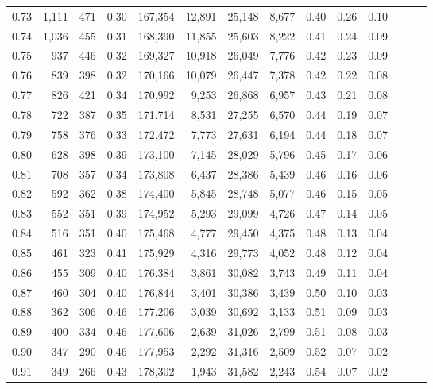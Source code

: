 \begin{tabular}{rrrrrrrrrrrrrr}
0.73 &  1,111 &  471 &  0.30 &  167,354 &   12,891 &  25,148 &   8,677 &  0.40 &  0.26 &      0.10 \\
0.74 &  1,036 &  455 &  0.31 &  168,390 &   11,855 &  25,603 &   8,222 &  0.41 &  0.24 &      0.09 \\
0.75 &    937 &  446 &  0.32 &  169,327 &   10,918 &  26,049 &   7,776 &  0.42 &  0.23 &      0.09 \\
0.76 &    839 &  398 &  0.32 &  170,166 &   10,079 &  26,447 &   7,378 &  0.42 &  0.22 &      0.08 \\
0.77 &    826 &  421 &  0.34 &  170,992 &    9,253 &  26,868 &   6,957 &  0.43 &  0.21 &      0.08 \\
0.78 &    722 &  387 &  0.35 &  171,714 &    8,531 &  27,255 &   6,570 &  0.44 &  0.19 &      0.07 \\
0.79 &    758 &  376 &  0.33 &  172,472 &    7,773 &  27,631 &   6,194 &  0.44 &  0.18 &      0.07 \\
0.80 &    628 &  398 &  0.39 &  173,100 &    7,145 &  28,029 &   5,796 &  0.45 &  0.17 &      0.06 \\
0.81 &    708 &  357 &  0.34 &  173,808 &    6,437 &  28,386 &   5,439 &  0.46 &  0.16 &      0.06 \\
0.82 &    592 &  362 &  0.38 &  174,400 &    5,845 &  28,748 &   5,077 &  0.46 &  0.15 &      0.05 \\
0.83 &    552 &  351 &  0.39 &  174,952 &    5,293 &  29,099 &   4,726 &  0.47 &  0.14 &      0.05 \\
0.84 &    516 &  351 &  0.40 &  175,468 &    4,777 &  29,450 &   4,375 &  0.48 &  0.13 &      0.04 \\
0.85 &    461 &  323 &  0.41 &  175,929 &    4,316 &  29,773 &   4,052 &  0.48 &  0.12 &      0.04 \\
0.86 &    455 &  309 &  0.40 &  176,384 &    3,861 &  30,082 &   3,743 &  0.49 &  0.11 &      0.04 \\
0.87 &    460 &  304 &  0.40 &  176,844 &    3,401 &  30,386 &   3,439 &  0.50 &  0.10 &      0.03 \\
0.88 &    362 &  306 &  0.46 &  177,206 &    3,039 &  30,692 &   3,133 &  0.51 &  0.09 &      0.03 \\
0.89 &    400 &  334 &  0.46 &  177,606 &    2,639 &  31,026 &   2,799 &  0.51 &  0.08 &      0.03 \\
0.90 &    347 &  290 &  0.46 &  177,953 &    2,292 &  31,316 &   2,509 &  0.52 &  0.07 &      0.02 \\
0.91 &    349 &  266 &  0.43 &  178,302 &    1,943 &  31,582 &   2,243 &  0.54 &  0.07 &      0.02 \\

\end{tabular}
